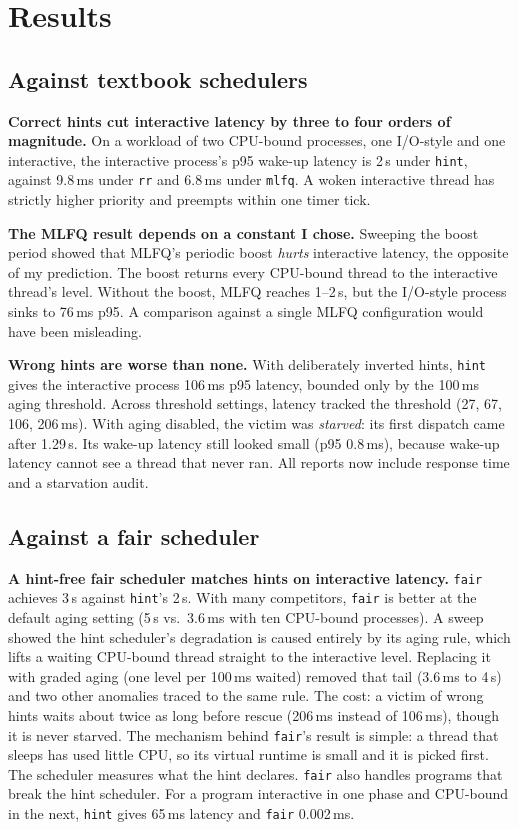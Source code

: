 \documentclass[10pt,twocolumn]{article}
\newcommand{\us}{\,\textmu s}
\newcommand{\ms}{\,ms}
\newcommand{\pol}[1]{\texttt{#1}}
\newcommand{\finding}[1]{\textbf{#1}}
\begin{document}
\section{Results}\label{sec:results}

\subsection{Against textbook schedulers}
\finding{Correct hints cut interactive latency by three to four orders of magnitude.}
On a workload of two CPU-bound processes, one I/O-style and one interactive, the
interactive process's p95 wake-up latency is 2\us{} under \pol{hint}, against 9.8\ms{}
under \pol{rr} and 6.8\ms{} under \pol{mlfq}. A woken interactive thread has strictly
higher priority and preempts within one timer tick.

\finding{The MLFQ result depends on a constant I chose.} Sweeping the boost period showed
that MLFQ's periodic boost \emph{hurts} interactive latency, the opposite of my prediction.
The boost returns every CPU-bound thread to the interactive thread's level. Without the
boost, MLFQ reaches 1--2\us{}, but the I/O-style process sinks to 76\ms{} p95. A
comparison against a single MLFQ configuration would have been misleading.

\finding{Wrong hints are worse than none.} With deliberately inverted hints, \pol{hint}
gives the interactive process 106\ms{} p95 latency, bounded only by the 100\ms{} aging
threshold. Across threshold settings, latency tracked the threshold (27, 67, 106,
206\ms). With aging disabled, the victim was \emph{starved}: its first dispatch came after
1.29\,s. Its wake-up latency still looked small (p95 0.8\ms), because wake-up latency cannot
see a thread that never ran. All reports now include response time and a starvation audit.

\subsection{Against a fair scheduler}
\finding{A hint-free fair scheduler matches hints on interactive latency.} \pol{fair}
achieves 3\us{} against \pol{hint}'s 2\us. With many competitors, \pol{fair} is
better at the default aging setting (5\us{} vs.\ 3.6\ms{} with ten CPU-bound
processes). A sweep showed the hint scheduler's degradation is caused entirely by its aging
rule, which lifts a waiting CPU-bound thread straight to the interactive level. Replacing
it with graded aging (one level per 100\ms{} waited) removed that tail (3.6\ms{} to
4\us) and two other anomalies traced to the same rule. The cost: a victim of wrong hints
waits about twice as long before rescue (206\ms{} instead of 106\ms), though it is never
starved. The mechanism behind \pol{fair}'s result is simple: a thread that sleeps has used little CPU, so its virtual
runtime is small and it is picked first. The scheduler measures what the hint declares.
\pol{fair} also handles programs that break the hint scheduler. For a program interactive in
one phase and CPU-bound in the next, \pol{hint} gives 65\ms{} latency and \pol{fair}
0.002\ms.
\end{document}
